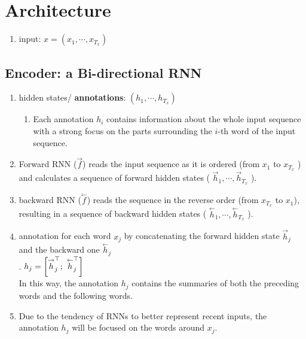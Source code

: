 \section{Architecture}


\begin{enumerate}
    \item input: $x = (x_1, \cdots, x_{T_x})$
    \hfill \cite{adv-ml-tech/paper/arxiv.org/1409.0473}
\end{enumerate}

\subsection{Encoder: a Bi-directional RNN}

\begin{enumerate}
    \item hidden states/ \textbf{annotations}: $(h_1, \cdots, h_{T_x})$
    \hfill \cite{adv-ml-tech/paper/arxiv.org/1409.0473}
    \begin{enumerate}
        \item  Each annotation $h_i$ contains information about the whole input sequence with a strong focus on the parts surrounding the $i$-th word of the input sequence.
        \hfill \cite{adv-ml-tech/paper/arxiv.org/1409.0473}
    \end{enumerate}

    
    \item Forward RNN ($\overset{\rightarrow}{f}$) reads the input sequence as it is ordered (from $x_1$ to $x_{T_x}$ ) and calculates a sequence of forward hidden states ( $\overset{\rightarrow}{h}_1, \cdots , \overset{\rightarrow}{h}_{T_x}$ ).
    \hfill \cite{adv-ml-tech/paper/arxiv.org/1409.0473}

    \item backward RNN ($\overset{\leftarrow}{f}$) reads the sequence in the reverse order (from $x_{T_x}$ to $x_1$), resulting in a sequence of backward hidden states ( $\overset{\leftarrow}{h}_1, \cdots , \overset{\leftarrow}{h}_{T_x}$ ).
    \hfill \cite{adv-ml-tech/paper/arxiv.org/1409.0473}

    \item  annotation for each word $x_j$ by concatenating the forward hidden state $\overset{\rightarrow}{h} _j$ and the backward one $\overset{\leftarrow}{h} _j$
    \hfill \cite{adv-ml-tech/paper/arxiv.org/1409.0473}
    \\
    .\hfill
    $
        h_j = \dSquareBrac{
            \overset{\rightarrow}{h} _j^\top ; \ 
            \overset{\leftarrow}{h} _j^\top
        }
    $
    \hfill \cite{adv-ml-tech/paper/arxiv.org/1409.0473}
    \\
    In this way, the annotation $h_j$ contains the summaries of both the preceding words and the following words.
    \hfill \cite{adv-ml-tech/paper/arxiv.org/1409.0473}

    \item Due to the tendency of RNNs to better represent recent inputs, the annotation $h_j$ will be focused on the words around $x_j$.
    \hfill \cite{adv-ml-tech/paper/arxiv.org/1409.0473}
\end{enumerate}

